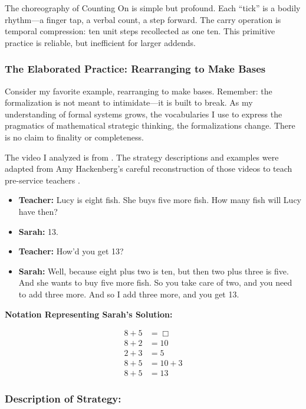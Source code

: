 \documentclass[12pt]{book}
\begin{document}
The choreography of Counting On is simple but profound. Each ``tick'' is a bodily rhythm---a finger tap, a verbal count, a step forward. The carry operation is temporal compression: ten unit steps recollected as one ten. This primitive practice is reliable, but inefficient for larger addends.

\subsubsection*{The Elaborated Practice: Rearranging to Make Bases}

Consider my favorite example, rearranging to make bases. Remember: the formalization is not meant to intimidate---it is built to break. As my understanding of formal systems grows, the vocabularies I use to express the pragmatics of mathematical strategic thinking, the formalizations change. There is no claim to finality or completeness.

The video I analyzed is from \textcite{Carpenter1999}. The strategy descriptions and examples were adapted from Amy Hackenberg's careful reconstruction of those videos to teach pre-service teachers \textcite{HackenbergCourseNotes}. 
\begin{itemize}
\item \textbf{Teacher:} Lucy is eight fish. She buys five more fish. How many fish will Lucy have then?
\item \textbf{Sarah:}  13. 
\item \textbf{Teacher:} How'd you get 13? 
\item \textbf{Sarah:} Well, because eight plus two is ten, but then two plus three is five. And she wants to buy five more fish. So you take care of two, and you need to add three more. And so I add three more, and you get 13.
\end{itemize}


\noindent \textbf{Notation Representing Sarah's Solution:}

\begin{align*}
8 + 5 &= \Box \\
8+2 &= 10\\
2+3 &= 5\\
8+5&= 10 + 3\\
8+5 &= 13
\end{align*}

\subsubsection*{Description of Strategy:}
\end{document}
